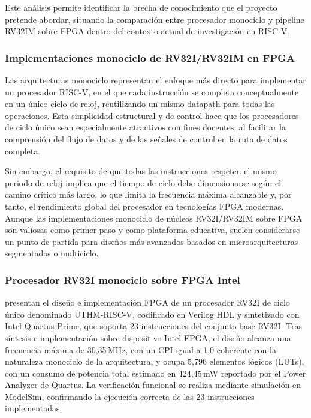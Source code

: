 Este análisis permite identificar la brecha de conocimiento que el proyecto
pretende abordar, situando la comparación entre procesador monociclo y
pipeline RV32IM sobre FPGA dentro del contexto actual de investigación
en RISC-V.



\subsubsection{Implementaciones monociclo de RV32I/RV32IM en FPGA}

Las arquitecturas monociclo representan el enfoque más directo para implementar un procesador RISC-V, en el que cada instrucción se completa conceptualmente en un único ciclo de reloj, reutilizando un mismo datapath para todas las operaciones.\parencite{Harris2021Digital}
Esta simplicidad estructural y de control hace que los procesadores de ciclo único sean especialmente atractivos con fines docentes, al facilitar la comprensión del flujo de datos y de las señales de control en la ruta de datos completa.\parencite{Harris2021Digital,Anjana2025Implementation}

Sin embargo, el requisito de que todas las instrucciones respeten el mismo periodo de reloj implica que el tiempo de ciclo debe dimensionarse según el camino crítico más largo, lo que limita la frecuencia máxima alcanzable y, por tanto, el rendimiento global del procesador en tecnologías FPGA modernas.\parencite{Patterson2017Computer,Chu2011FPGA}
Aunque las implementaciones monociclo de núcleos RV32I/RV32IM sobre FPGA son valiosas como primer paso y como plataforma educativa, suelen considerarse un punto de partida para diseños más avanzados basados en microarquitecturas segmentadas o multiciclo.


\subsubsection{Procesador RV32I monociclo sobre FPGA Intel}

\textcite{Goh2024UTHMRISCV} presentan el diseño e implementación FPGA de
un procesador RV32I de ciclo único denominado UTHM-RISC-V, codificado en
Verilog HDL y sintetizado con Intel Quartus Prime, que soporta 23 instrucciones
del conjunto base RV32I.
Tras síntesis e implementación sobre dispositivo Intel FPGA, el diseño alcanza
una frecuencia máxima de 30{,}35\,MHz, con un CPI igual a 1{,}0 coherente con
la naturaleza monociclo de la arquitectura, y ocupa 5{,}796 elementos lógicos
(LUTs), con un consumo de potencia total estimado en 424{,}45\,mW reportado
por el Power Analyzer de Quartus.
La verificación funcional se realiza mediante simulación en ModelSim, confirmando
la ejecución correcta de las 23 instrucciones implementadas.

